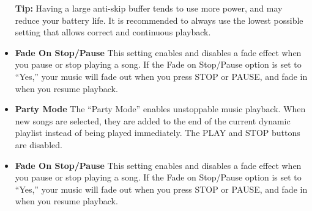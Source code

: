 \begin{itemize}

  \textbf{Tip:  }Having a large anti-skip buffer tends to use more power, and may reduce your battery life. It is recommended to always use the lowest possible setting that allows correct and continuous playback.

  \item \textbf{Fade On Stop/Pause}
    This setting enables and disables a fade effect when you pause or stop playing a song.  If the Fade on Stop/Pause option is set to ``Yes,'' your music will fade out when you press STOP or PAUSE, and fade in when you resume playback.

  \item \textbf{Party Mode}
    The ``Party Mode'' enables unstoppable music playback.  When new songs are selected, they are added to the end of the current dynamic playlist instead of being played immediately.  The PLAY and STOP buttons are disabled.
    
  \item \textbf{Fade On Stop/Pause}
    This setting enables and disables a fade effect when you pause or stop playing a song.  If the Fade on Stop/Pause option is set to ``Yes,'' your music will fade out when you press STOP or PAUSE, and fade in when you resume playback.


\end{itemize}
